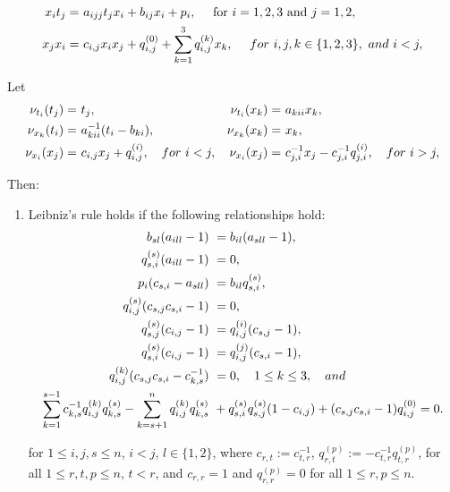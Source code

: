 \documentclass[10pt,a4paper]{amsart}
\begin{document}
\begin{align}
    x_it_j = &\  a_{ijj}t_jx_i+b_{ij}x_i+ p_i, \quad \text{ for } i=1, 2, 3 \text{ and } j=1, 2, \label{DSdostresSPBW11} \\
    x_j x_i = &\ c_{i, j}x_i x_j + q_{i,j}^{(0)} + \sum_{k=1}^{3}q_{i,j}^{(k)}x_k, \quad\ {\rm for}\ i, j, k \in \{1, 2, 3\}, \ {\rm and} \ i < j, \label{DSdostresSPBW1}
\end{align}

\begin{proposition}\label{autoSkewPBW23}
Let
\begin{align}
   \nu_{t_i}(t_j) = &\ t_j, & \nu_{t_i}(x_k) = &\ a_{kii}x_k, \label{Autoskew4.38} \\
   \nu_{x_k}(t_i) = &\ a_{kii}^{-1}(t_i-b_{ki}),   &  \nu_{x_k}(x_k) = &\ x_k, \label{Autoskew4.39} \\
   \nu_{x_i}(x_j) = &\ c_{i,j}x_j+q_{i,j}^{(i)}, \quad {\rm for}\ i < j, & \nu_{x_i}(x_j) = &\ c_{j,i}^{-1}x_j-c_{j,i}^{-1}q_{j,i}^{(i)},  \quad {\rm for}\ i > j,  \label{Autoskew4.40}   
\end{align}

Then:
\begin{enumerate}
\item [\rm (1)] Leibniz's rule holds if the following relationships hold:
\begin{align}
    b_{sl}(a_{ill}-1) &\ =b_{il}(a_{sll}-1), \label{cond4.563} \\
    q_{s,i}^{(s)}(a_{ill}-1) &\ =0,\label{cond4.573} \\
    p_i(c_{s,i}-a_{sll}) &\ =b_{il}q_{s,i}^{(s)}, \label{cond4.583} \\
    q_{i,j}^{(s)}(c_{s,j}c_{s,i}-1) &\ =0, \label{cond4.593} \\
    q_{s,j}^{(s)}(c_{i,j}-1) &\ = q_{i,j}^{(i)}(c_{s,j}-1), \label{cond4.603} \\
    q_{s,i}^{(s)}(c_{i,j}-1) &\ = q_{i,j}^{(j)}(c_{s,i}-1), \label{cond4.613} \\
    q_{i,j}^{(k)}(c_{s,j}c_{s,i}-c_{k,s}^{-1}) &\ =0, \quad 1\leq k \leq 3, \quad {\rm and}  \label{cond4.623} \\
     \sum_{k=1}^{s-1}c_{k,s}^{-1}q_{i,j}^{(k)}q_{k,s}^{(s)}-\sum_{k=s+1}^{n}q_{i,j}^{(k)}q_{k,s}^{(s)} &\ 
     +q_{s,i}^{(s)}q_{s,j}^{(s)}(1-c_{i,j})+(c_{s,j}c_{s,i}-1)q_{i,j}^{(0)}  = 0. \label{cond4.633}
\end{align}

for $1 \leq i,j,s \leq n$, $i<j$, $l \in \{1, 2\}$, where $c_{r,t}:=c_{t,r}^{-1}$, $q_{r,t}^{(p)}:=-c_{t,r}^{-1}q_{t,r}^{(p)}$, for all $1 \leq r,t,p \leq n$, $t<r$, and  $c_{r,r}=1$ and $q_{r,r}^{(p)}=0$ for all $1 \leq r,p \leq n$.


\end{enumerate}
\end{proposition}
\end{document}
